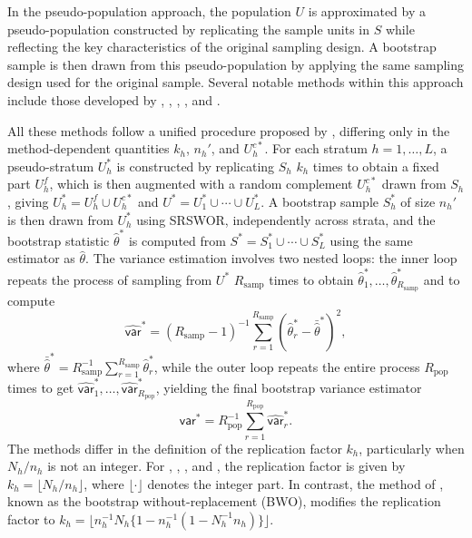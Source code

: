 \noindent In the pseudo-population approach, the population \(U\) is approximated by a pseudo-population constructed by replicating the sample units in \(\textrm{$S$}\) while reflecting the key characteristics of the original sampling design. A bootstrap sample is then drawn from this pseudo-population by applying the same sampling design used for the original sample. Several notable methods within this approach include those developed by \citet{Bickel:Freedman:1984}, \citet{Chao:Lo:1985}, \citet{Sitter:1992a}, \citet{Booth:Butler:Hall:1994}, and \citet{Chao:Lo:1994}.

All these methods follow a unified procedure proposed by \citet{Mashreghi:Haziza:Leger:2016}, differing only in the method-dependent quantities \(k_h\), \(n_h'\), and \(U_h^{c*}\). For each stratum \(h = 1, \ldots, L\), a pseudo-stratum \(U_h^*\) is constructed by replicating \(\textrm{$S$}_h\) \(k_h\) times to obtain a fixed part \(U_h^f\), which is then augmented with a random complement \(U_h^{c*}\) drawn from \(\textrm{$S$}_h\), giving \(U_h^* = U_h^f \cup U_h^{c*}\) and \(U^* = U_1^* \cup \cdots \cup U_L^*\). A bootstrap sample \(\textrm{$S$}_h^*\) of size \(n_h'\) is then drawn from \(U_h^*\) using SRSWOR, independently across strata, and the bootstrap statistic \(\hat{\theta}^*\) is computed from \(\textrm{$S$}^* = \textrm{$S$}_1^* \cup \cdots \cup \textrm{$S$}_L^*\) using the same estimator as \(\hat{\theta}\). The variance estimation involves two nested loops: the inner loop repeats the process of sampling from \(U^*\) \(R_{\text{samp}}\) times to obtain \(\hat{\theta}^*_1, \ldots, \hat{\theta}^*_{R_{\text{samp}}}\) and to compute
\[
    \hat{\mathsf{var}}^* = (R_{\text{samp}} - 1)^{-1} \sum_{r=1}^{R_{\text{samp}}}
(\hat{\theta}_r^* - \bar{\hat{\theta}}^*)^2,
\]
where \(\bar{\hat{\theta}}^* = R_{\text{samp}}^{-1} \sum_{r=1}^{R_{\text{samp}}} \hat{\theta}_r^*\), while the outer loop repeats the entire process \(R_{\text{pop}}\) times to get \(\hat{\mathsf{var}}_1^* ,\ldots, \hat{\mathsf{var}}_{R_{\text{pop}}}^*\), yielding the final bootstrap variance estimator
\begin{equation}
    \mathsf{var}^* = R_{\text{pop}}^{-1} \sum_{r=1}^{R_{\text{pop}}} \hat{\mathsf{var}}_r^*.
    \label{eq:MCVarTwoloops}
\end{equation}
The methods differ in the definition of the replication factor \(k_h\), particularly when \(N_h/n_h\) is not an integer. For \citet{Booth:Butler:Hall:1994}, \citet{Chao:Lo:1994}, \citet{Bickel:Freedman:1984}, and \citet{Chao:Lo:1985}, the replication factor is given by \(k_h = \lfloor N_h/n_h \rfloor\), where \(\lfloor \cdot \rfloor\) denotes the integer part. In contrast, the method of \citet{Sitter:1992a}, known as the bootstrap without-replacement (BWO), modifies the replication factor to \(k_h = \lfloor n_h^{-1}N_h\{1 - n_h^{-1}({1 - N_h^{-1}n_h})\}\rfloor.\)


